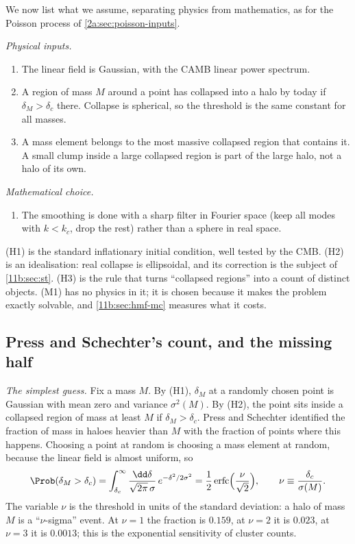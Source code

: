 We now list what we assume, separating physics from mathematics, as for the
Poisson process of \cref{2a:sec:poisson-inputs}.

\emph{Physical inputs.}
\begin{enumerate}[label=(H\arabic*),leftmargin=2.6em,itemsep=1pt]
  \item The linear field is Gaussian, with the CAMB linear power spectrum.
  \item A region of mass $M$ around a point has collapsed into a halo by today
        if $\delta_M>\delta_c$ there. Collapse is spherical, so the threshold is
        the same constant for all masses.
  \item A mass element belongs to the most massive collapsed region that
        contains it. A small clump inside a large collapsed region is part of the
        large halo, not a halo of its own.
\end{enumerate}
\emph{Mathematical choice.}
\begin{enumerate}[label=(M\arabic*),leftmargin=2.6em,itemsep=1pt]
  \item The smoothing is done with a sharp filter in Fourier space (keep all
        modes with $k<k_c$, drop the rest) rather than a sphere in real space.
\end{enumerate}
(H1) is the standard inflationary initial condition, well tested by the CMB.
(H2) is an idealisation: real collapse is ellipsoidal, and its correction is the
subject of \cref{11b:sec:st}. (H3) is the rule that turns ``collapsed regions''
into a count of distinct objects. (M1) has no physics in it; it is chosen because
it makes the problem exactly solvable, and \cref{11b:sec:hmf-mc} measures what it
costs.

\subsection{Press and Schechter's count, and the missing half}
\label{11b:sec:ps}

\emph{The simplest guess.} Fix a mass $M$. By (H1), $\delta_M$ at a randomly
chosen point is Gaussian with mean zero and variance $\sigma^2(M)$. By (H2), the
point sits inside a collapsed region of mass at least $M$ if $\delta_M>\delta_c$.
Press and Schechter \cite{PressSchechter1974} identified the fraction of mass in
haloes heavier than $M$ with the fraction of points where this happens. Choosing a
point at random is choosing a mass element at random, because the linear field is
almost uniform, so
\begin{equation}
  \Prob(\delta_M>\delta_c)
  =\int_{\delta_c}^{\infty}\frac{\dd\delta}{\sqrt{2\pi}\,\sigma}\,
     e^{-\delta^2/2\sigma^2}
  =\frac12\operatorname{erfc}\Bigl(\frac{\nu}{\sqrt2}\Bigr),
  \qquad \nu\equiv\frac{\delta_c}{\sigma(M)} .
  \label{11b:eq:ps-naive}
\end{equation}
The variable $\nu$ is the threshold in units of the standard deviation: a halo of
mass $M$ is a ``$\nu$-sigma'' event. At $\nu=1$ the fraction is $0.159$, at $\nu=2$
it is $0.023$, at $\nu=3$ it is $0.0013$; this is the exponential sensitivity
of cluster counts.


